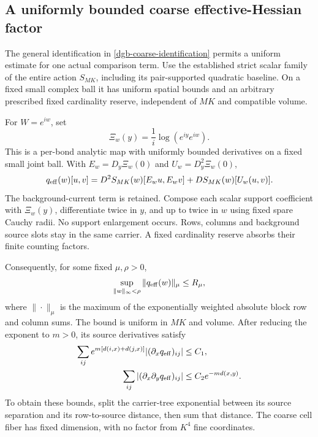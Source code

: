 \documentclass[11pt]{article}
\theoremstyle{remark}
\begin{document}
\subsection{A uniformly bounded coarse effective-Hessian factor}
\label{dgb-coarse-bound-section}

The general identification in
\eqref{dgb-coarse-identification} permits a uniform estimate
for one actual comparison term. Use the established strict
scalar family of the entire action $S_{MK}$, including its
pair-supported quadratic baseline. On a fixed small complex
ball it has uniform spatial bounds and an arbitrary
prescribed fixed cardinality reserve, independent of
$MK$ and compatible volume.

For $W=e^{iw}$, set
\[
                    \Xi_w(y)=\frac1i\log(e^{iy}e^{iw}).
\]
This is a per-bond analytic map with uniformly bounded
derivatives on a fixed small joint ball. With
$E_w=D_y\Xi_w(0)$ and $U_w=D_y^2\Xi_w(0)$,
\begin{equation}
 q_{\rm eff}(w)[u,v]
   =D^2S_{MK}(w)[E_wu,E_wv]
                 +DS_{MK}(w)[U_w(u,v)].
 \label{dgb-coarse-BCH}
\end{equation}
The background-current term is retained.
Compose each scalar support coefficient with $\Xi_w(y)$,
differentiate twice in $y$, and up to twice in $w$ using
fixed spare Cauchy radii. No support enlargement occurs.
Rows, columns and background source slots stay in the
same carrier. A fixed cardinality reserve absorbs their
finite counting factors.

Consequently, for some fixed $\mu,\rho>0$,
\begin{equation}
       \sup_{\|w\|_\infty<\rho}
                    \|q_{\rm eff}(w)\|_\mu\leq R_\mu,
 \label{dgb-coarse-Schur}
\end{equation}
where $\|\cdot\|_\mu$ is the maximum of the exponentially
weighted absolute block row and column sums.
The bound is uniform in $MK$ and volume. After reducing
the exponent to $m>0$, its source derivatives satisfy
\begin{align}
 \sum_{ij}e^{m[d(i,x)+d(j,x)]}
       |(\partial_xq_{\rm eff})_{ij}|&\leq C_1,\notag\\
 \sum_{ij}|(\partial_x\partial_yq_{\rm eff})_{ij}|
                              &\leq C_2e^{-md(x,y)}.
 \label{dgb-coarse-source-bounds}
\end{align}
To obtain these bounds, split the carrier-tree exponential
between its source separation and its row-to-source
distance, then sum that distance. The coarse cell fiber
has fixed dimension, with no factor from $K^4$ fine
coordinates.
\end{document}
